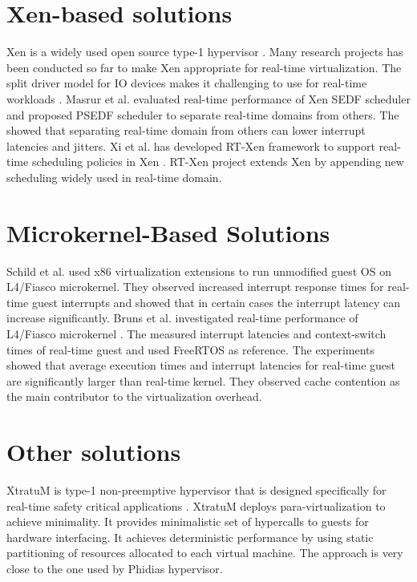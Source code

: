 \section{Xen-based solutions}
Xen is a widely used open source type-1 hypervisor \cite{Barham:2003:XAV:1165389.945462}. 
Many research projects has been conducted so far to make Xen appropriate for real-time virtualization.
The split driver model for IO devices makes it challenging to use for real-time workloads \cite{Yoo:2011:TUI:2103799.2103816}.
Masrur et al. \cite{masrur2010vm} evaluated real-time performance of Xen SEDF scheduler and proposed PSEDF scheduler to separate
real-time domains from others. The showed that separating real-time domain from others can lower interrupt latencies and jitters.
Xi et al. has developed RT-Xen framework to support real-time scheduling policies in Xen \cite{Xi:2011:RTR:2038642.2038651}.
RT-Xen project extends Xen by appending new scheduling widely used in real-time domain.

\section{Microkernel-Based Solutions}
Schild et al. \cite{schild2009faithful} used x86 virtualization extensions to run unmodified guest OS on L4/Fiasco microkernel.
They observed increased interrupt response times for real-time guest interrupts and showed that in certain cases the interrupt latency
can increase significantly.
Bruns et al. investigated real-time performance of L4/Fiasco microkernel \cite{bruns2010evaluation}.
The measured interrupt latencies and context-switch times of real-time guest and used FreeRTOS as reference.
The experiments showed that average execution times and interrupt latencies for real-time guest are significantly larger than real-time kernel.
They observed cache contention as the main contributor to the virtualization overhead.


\section{Other solutions}
XtratuM is type-1 non-preemptive hypervisor that is designed specifically for real-time safety critical applications \cite{Carrascosa:2014:XHR:2668138.2668142}.
XtratuM deploys para-virtualization to achieve minimality. It provides minimalistic set of hypercalls to guests for hardware interfacing.
It achieves deterministic performance by using static partitioning of resources allocated to each virtual machine.
The approach is very close to the one used by Phidias hypervisor.

